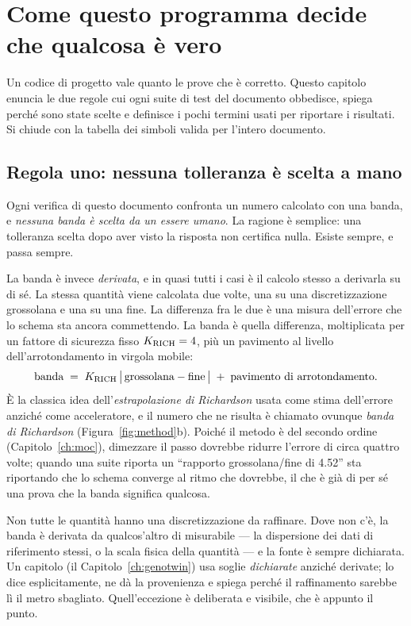 \chapter{Come questo programma decide che qualcosa è vero}
\label{ch:method}

Un codice di progetto vale quanto le prove che è corretto. Questo
capitolo enuncia le due regole cui ogni suite di test del documento
obbedisce, spiega perché sono state scelte e definisce i pochi
termini usati per riportare i risultati. Si chiude con la tabella
dei simboli valida per l'intero documento.

\section{Regola uno: nessuna tolleranza è scelta a mano}

Ogni verifica di questo documento confronta un numero calcolato con
una banda, e \emph{nessuna banda è scelta da un essere umano}. La
ragione è semplice: una tolleranza scelta dopo aver visto la
risposta non certifica nulla. Esiste sempre, e passa sempre.

La banda è invece \emph{derivata}, e in quasi tutti i casi è il
calcolo stesso a derivarla su di sé. La stessa quantità viene
calcolata due volte, una su una discretizzazione grossolana e una su
una fine. La differenza fra le due è una misura dell'errore che lo
schema sta ancora commettendo. La banda è quella differenza,
moltiplicata per un fattore di sicurezza fisso
$K_{\rm RICH} = 4$, più un pavimento al livello
dell'arrotondamento in virgola mobile:
\begin{equation}
\text{banda} \;=\; K_{\rm RICH}\,
\bigl|\,\text{grossolana} - \text{fine}\,\bigr|
\;+\; \text{pavimento di arrotondamento}.
\label{eq:band}
\end{equation}
È la classica idea dell'\emph{estrapolazione di Richardson} usata
come stima dell'errore anziché come acceleratore, e il numero che ne
risulta è chiamato ovunque \emph{banda di Richardson}
(Figura~\ref{fig:method}b). Poiché il metodo è del secondo ordine
(Capitolo~\ref{ch:moc}), dimezzare il passo dovrebbe ridurre
l'errore di circa quattro volte; quando una suite riporta un
``rapporto grossolana/fine di 4.52'' sta riportando che lo schema
converge al ritmo che dovrebbe, il che è già di per sé una prova
che la banda significa qualcosa.

Non tutte le quantità hanno una discretizzazione da raffinare. Dove
non c'è, la banda è derivata da qualcos'altro di misurabile --- la
dispersione dei dati di riferimento stessi, o la scala fisica della
quantità --- e la fonte è sempre dichiarata. Un capitolo (il
Capitolo~\ref{ch:genotwin}) usa soglie \emph{dichiarate} anziché
derivate; lo dice esplicitamente, ne dà la provenienza e spiega
perché il raffinamento sarebbe lì il metro sbagliato. Quell'eccezione
è deliberata e visibile, che è appunto il punto.

